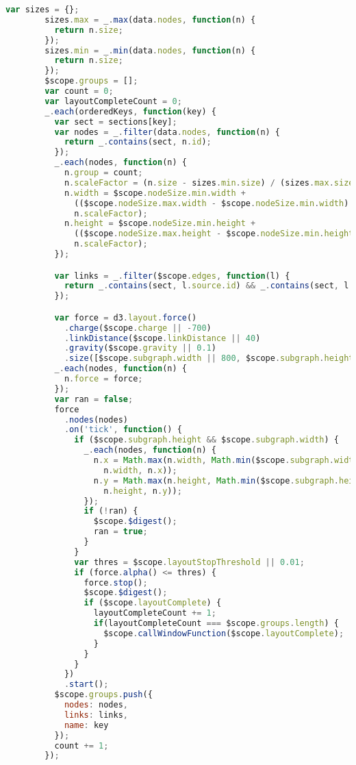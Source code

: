 \begin{lstlisting}[language=JavaScript]
        var sizes = {};
        sizes.max = _.max(data.nodes, function(n) {
          return n.size;
        });
        sizes.min = _.min(data.nodes, function(n) {
          return n.size;
        });
        $scope.groups = [];
        var count = 0;
        var layoutCompleteCount = 0;
        _.each(orderedKeys, function(key) {
          var sect = sections[key];
          var nodes = _.filter(data.nodes, function(n) {
            return _.contains(sect, n.id);
          });
          _.each(nodes, function(n) {
            n.group = count;
            n.scaleFactor = (n.size - sizes.min.size) / (sizes.max.size - sizes.min.size);
            n.width = $scope.nodeSize.min.width +
              (($scope.nodeSize.max.width - $scope.nodeSize.min.width) *
              n.scaleFactor);
            n.height = $scope.nodeSize.min.height +
              (($scope.nodeSize.max.height - $scope.nodeSize.min.height) *
              n.scaleFactor);
          });

          var links = _.filter($scope.edges, function(l) {
            return _.contains(sect, l.source.id) && _.contains(sect, l.target.id);
          });

          var force = d3.layout.force()
            .charge($scope.charge || -700)
            .linkDistance($scope.linkDistance || 40)
            .gravity($scope.gravity || 0.1)
            .size([$scope.subgraph.width || 800, $scope.subgraph.height || 800]);
          _.each(nodes, function(n) {
            n.force = force;
          });
          var ran = false;
          force
            .nodes(nodes)
            .on('tick', function() {
              if ($scope.subgraph.height && $scope.subgraph.width) {
                _.each(nodes, function(n) {
                  n.x = Math.max(n.width, Math.min($scope.subgraph.width -
                    n.width, n.x));
                  n.y = Math.max(n.height, Math.min($scope.subgraph.height -
                    n.height, n.y));
                });
                if (!ran) {
                  $scope.$digest();
                  ran = true;
                }
              }
              var thres = $scope.layoutStopThreshold || 0.01;
              if (force.alpha() <= thres) {
                force.stop();
                $scope.$digest();
                if ($scope.layoutComplete) {
                  layoutCompleteCount += 1;
                  if(layoutCompleteCount === $scope.groups.length) {
                    $scope.callWindowFunction($scope.layoutComplete);
                  }
                }
              }
            })
            .start();
          $scope.groups.push({
            nodes: nodes,
            links: links,
            name: key
          });
          count += 1;
        });


\end{lstlisting}
